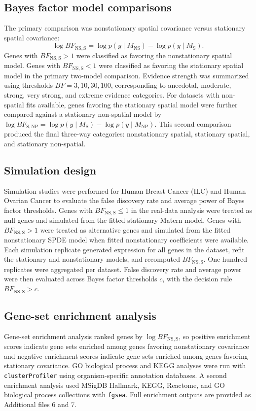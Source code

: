 \subsection{Bayes factor model comparisons}
The primary comparison was nonstationary spatial covariance versus stationary spatial covariance:
\[
\log BF_{\mathrm{NS,S}} = \log p(y \mid M_{\mathrm{NS}}) - \log p(y \mid M_{\mathrm{S}}).
\]
Genes with \(BF_{\mathrm{NS,S}}>1\) were classified as favoring the nonstationary spatial model. Genes with \(BF_{\mathrm{NS,S}}<1\) were classified as favoring the stationary spatial model in the primary two-model comparison. Evidence strength was summarized using thresholds \(BF=3,10,30,100\), corresponding to anecdotal, moderate, strong, very strong, and extreme evidence categories. For datasets with non-spatial fits available, genes favoring the stationary spatial model were further compared against a stationary non-spatial model by \(\log BF_{\mathrm{S,NP}} = \log p(y \mid M_{\mathrm{S}})-\log p(y \mid M_{\mathrm{NP}})\). This second comparison produced the final three-way categories: nonstationary spatial, stationary spatial, and stationary non-spatial.

\subsection{Simulation design}
Simulation studies were performed for Human Breast Cancer (ILC) and Human Ovarian Cancer to evaluate the false discovery rate and average power of Bayes factor thresholds. Genes with \(BF_{\mathrm{NS,S}}\le 1\) in the real-data analysis were treated as null genes and simulated from the fitted stationary Matern model. Genes with \(BF_{\mathrm{NS,S}}>1\) were treated as alternative genes and simulated from the fitted nonstationary SPDE model when fitted nonstationary coefficients were available. Each simulation replicate generated expression for all genes in the dataset, refit the stationary and nonstationary models, and recomputed \(BF_{\mathrm{NS,S}}\). One hundred replicates were aggregated per dataset. False discovery rate and average power were then evaluated across Bayes factor thresholds \(c\), with the decision rule \(BF_{\mathrm{NS,S}}>c\).

\subsection{Gene-set enrichment analysis}
Gene-set enrichment analysis ranked genes by \(\log BF_{\mathrm{NS,S}}\), so positive enrichment scores indicate gene sets enriched among genes favoring nonstationary covariance and negative enrichment scores indicate gene sets enriched among genes favoring stationary covariance. GO biological process and KEGG analyses were run with \texttt{clusterProfiler} using organism-specific annotation databases. A second enrichment analysis used MSigDB Hallmark, KEGG, Reactome, and GO biological process collections with \texttt{fgsea}. Full enrichment outputs are provided as Additional files 6 and 7.

